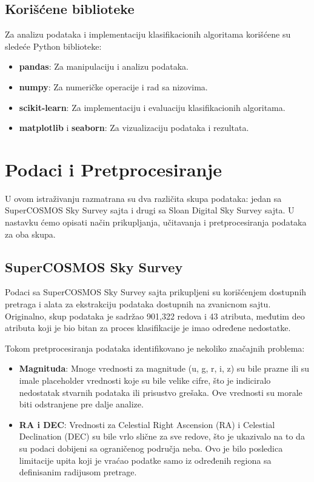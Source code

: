 \documentclass[a4paper,12pt]{article}
\begin{document}
\subsection{Korišćene biblioteke}
Za analizu podataka i implementaciju klasifikacionih algoritama korišćene su sledeće Python biblioteke:
\begin{itemize}
    \item \textbf{pandas}: Za manipulaciju i analizu podataka.
    \item \textbf{numpy}: Za numeričke operacije i rad sa nizovima.
    \item \textbf{scikit-learn}: Za implementaciju i evaluaciju klasifikacionih algoritama.
    \item \textbf{matplotlib} i \textbf{seaborn}: Za vizualizaciju podataka i rezultata.
\end{itemize}


\section{Podaci i Pretprocesiranje}
U ovom istraživanju razmatrana su dva različita skupa podataka: jedan sa SuperCOSMOS Sky Survey sajta i drugi sa Sloan Digital Sky Survey sajta. U nastavku ćemo opisati način prikupljanja, učitavanja i pretprocesiranja podataka za oba skupa.

\subsection{SuperCOSMOS Sky Survey}
Podaci sa SuperCOSMOS Sky Survey sajta prikupljeni su korišćenjem dostupnih pretraga i alata za ekstrakciju podataka dostupnih na zvanicnom sajtu. Originalno, skup podataka je sadržao 901,322 redova i 43 atributa, međutim deo atributa koji je bio bitan za proces klasifikacije je imao određene nedostatke.

Tokom pretprocesiranja podataka identifikovano je nekoliko značajnih problema:
\begin{itemize}
    \item \textbf{Magnituda}: Mnoge vrednosti za magnitude (u, g, r, i, z) su bile prazne ili su imale placeholder vrednosti koje su bile velike cifre, što je indiciralo nedostatak stvarnih podataka ili prisustvo grešaka. Ove vrednosti su morale biti odstranjene pre dalje analize.
    \item \textbf{RA i DEC}: Vrednosti za Celestial Right Ascension (RA) i Celestial Declination (DEC) su bile vrlo slične za sve redove, što je ukazivalo na to da su podaci dobijeni sa ograničenog područja neba. Ovo je bilo posledica limitacije upita  koji je vraćao podatke samo iz određenih regiona sa definisanim radijusom pretrage.
\end{itemize}
\end{document}
